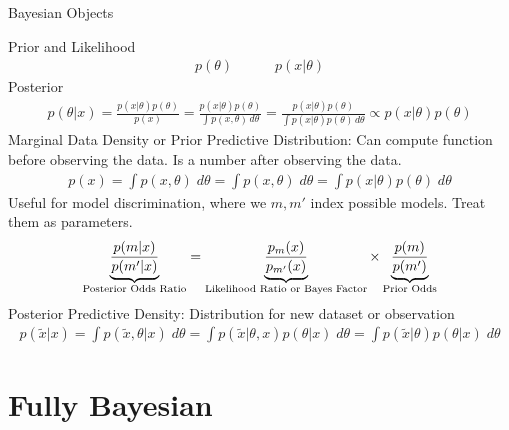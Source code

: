 \documentclass[aspectratio=169, handout]{beamer}
\begin{document}
{\scriptsize
\begin{frame}{Bayesian Objects}

\alert{Prior} and \alert{Likelihood}
\begin{align*}
  p(\theta)
  \qquad\quad
  p(x|\theta)
\end{align*}
\alert{Posterior}
\begin{align*}
  p(\theta|x)
  =
  \frac{p(x|\theta)p(\theta)}{p(x)}
  =
  \frac{p(x|\theta)p(\theta)}{\int p(x,\theta)\,d\theta}
  =
  \frac{p(x|\theta)p(\theta)}{\int p(x|\theta)p(\theta)\,d\theta}
  \propto
  p(x|\theta)p(\theta)
\end{align*}
\alert{Marginal Data Density} or \alert{Prior Predictive Distribution}:
Can compute function before observing the data.
Is a number after observing the data.
\begin{align*}
  p(x)
  =
  \int
  p(x,\theta)
  \;
  d\theta
  =
  \int
  p(x,\theta)
  \;
  d\theta
  =
  \int
  p(x|\theta)
  p(\theta)
  \;
  d\theta
\end{align*}
Useful for model discrimination, where we $m,m'$ index possible models.
Treat them as parameters.
\begin{align*}
  \underbrace{%
    \frac{p(m|x)}{p(m'|x)}
  }_{\text{Posterior Odds Ratio}}
  =
  \underbrace{%
    \frac{p_m(x)}{p_{m'}(x)}
  }_{\text{Likelihood Ratio or Bayes Factor}}
  \times
  \underbrace{%
    \frac{p(m)}{p(m')}
  }_{\text{Prior Odds}}
\end{align*}
\alert{Posterior Predictive Density}:
Distribution for new dataset or observation
\begin{align*}
  p(\tilde{x}|x)
  =
  \int
  p(\tilde{x},\theta|x)
  \;
  d\theta
  =
  \int
  p(\tilde{x}|\theta,x)
  p(\theta|x)
  \;
  d\theta
  =
  \int
  p(\tilde{x}|\theta)
  p(\theta|x)
  \;
  d\theta
\end{align*}

\end{frame}
}



\section{Fully Bayesian}
\end{document}

